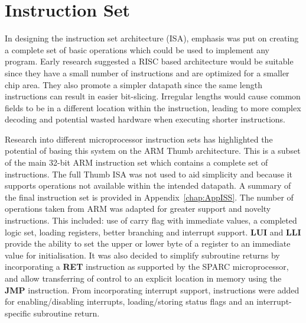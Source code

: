 
\chapter{Instruction Set}\label{ch:is}

In designing the instruction set architecture (ISA), emphasis was put on creating a complete set of basic operations which could be used to implement any program. 
Early research suggested a RISC based architecture would be suitable since they have a small number of instructions and are optimized for a smaller chip area. 
They also promote a simpler datapath since the same length instructions can result in easier bit-slicing. 
Irregular lengths would cause common fields to be in a different location within the instruction, leading to more complex decoding and potential wasted hardware when executing shorter instructions. 

Research into different microprocessor instruction sets has highlighted the potential of basing this system on the ARM Thumb architecture.
This is a subset of the main 32-bit ARM instruction set which contains a complete set of instructions. 
The full Thumb ISA was not used to aid simplicity and because it supports operations not available within the intended datapath. 
A summary of the final instruction set is provided in Appendix~\ref{chap:AppISS}. 
The number of operations taken from ARM was adapted for greater support and novelty instructions.
This included: use of carry flag with immediate values, a completed logic set, loading registers, better branching and interrupt support. 
\textbf{LUI} and \textbf{LLI} provide the ability to set the upper or lower byte of a register to an immediate value for initialisation. 
It was also decided to simplify subroutine returns by incorporating a \textbf{RET} instruction as supported by the SPARC microprocessor, and allow transferring of control to an explicit location in memory using the \textbf{JMP} instruction.
From incorporating interrupt support, instructions were added for enabling/disabling interrupts, loading/storing status flags and an interrupt-specific subroutine return.

